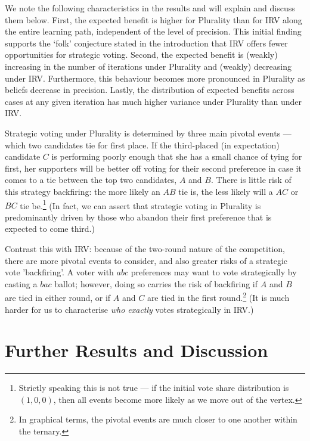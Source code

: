 \documentclass[12pt, letter]{article}
\begin{document}
We note the following characteristics in the results and will explain and discuss them below. First, the expected benefit is higher for Plurality than for IRV along the entire learning path, independent of the level of precision. This initial finding supports the `folk' conjecture stated in the introduction that IRV offers fewer opportunities for strategic voting. Second, the expected benefit is (weakly) increasing in the number of iterations under Plurality and (weakly) decreasing under IRV. Furthermore, this behaviour becomes more pronounced in Plurality as beliefs decrease in precision. Lastly, the distribution of expected benefits across cases at any given iteration has much higher variance under Plurality than under IRV.

Strategic voting under Plurality is determined by three main pivotal events --- which two candidates tie for first place. If the third-placed (in expectation) candidate $C$ is performing poorly enough that she has a small chance of tying for first, her supporters will be better off voting for their second preference in case it comes to a tie between the top two candidates, $A$ and $B$. There is little risk of this strategy backfiring: the more likely an $AB$ tie is, the less likely will a $AC$ or $BC$ tie be.\footnote{Strictly speaking this is not true --- if the initial vote share distribution is $(1, 0, 0)$, then all events become more likely as we move out of the vertex.} (In fact, we can assert that strategic voting in Plurality is predominantly driven by those who abandon their first preference that is expected to come third.)

Contrast this with IRV: because of the two-round nature of the competition, there are more pivotal events to consider, and also greater risks of a strategic vote 'backfiring'. A voter with $abc$ preferences may want to vote strategically by casting a $bac$ ballot; however, doing so carries the risk of backfiring if $A$ and $B$ are tied in either round, or if $A$ and $C$ are tied in the first round.\footnote{In graphical terms, the pivotal events are much closer to one another within the ternary.} (It is much harder for us to characterise \emph{who exactly} votes strategically in IRV.)

\section{Further Results and Discussion}
\end{document}
